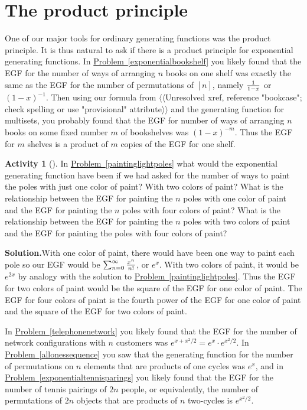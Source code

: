 \documentclass[10pt,]{book}
\theoremstyle{plain}
\theoremstyle{definition}
\newtheorem{activity}[project]{Activity}
\numberwithin{equation}{chapter}
\begin{document}
\section[{The product principle}]{The product principle}\label{section-9}
One of our major tools for ordinary generating functions was the product principle. It is thus natural to ask if there is a product principle for exponential generating functions. In \hyperref[exponentialbookshelf]{Problem~\ref{exponentialbookshelf}} you likely found that the EGF for the number of ways of arranging \(n\) books on one shelf was exactly the same as the EGF for the number of permutations of \([n]\), namely \(1\over 1-x\) or \((1-x)^{-1}\). Then using our formula from {$\langle\langle$Unresolved xref, reference "bookcase"; check spelling or use "provisional" attribute$\rangle\rangle$} and the generating function for multisets, you probably found that the EGF for number of ways of arranging \(n\) books on some fixed number \(m\) of bookshelves was \((1-x)^{-m}\). Thus the EGF for \(m\) shelves is a product of \(m\) copies of the EGF for one shelf.%
\begin{activity}[]\label{paintinglightpoles2}
In \hyperref[paintinglightpoles]{Problem~\ref{paintinglightpoles}} what would the exponential generating function have been if we had asked for the number of ways to paint the poles with just one color of paint? With two colors of paint? What is the relationship between the EGF for painting the \(n\) poles with one color of paint and the EGF for painting the \(n\) poles with four colors of paint? What is the relationship between the EGF for painting the \(n\) poles with two colors of paint and the EGF for painting the poles with four colors of paint?%
\par\medskip\noindent%
\textbf{Solution.}\quad With one color of paint, there would have been one way to paint each pole so our EGF would be \(\sum_{n=0}^\infty {x^n\over n!}\), or \(e^x\). With two colors of paint, it would be \(e^{2x}\) by analogy with the solution to \hyperref[paintinglightpoles]{Problem~\ref{paintinglightpoles}}. Thus the EGF for two colors of paint would be the square of the EGF for one color of paint. The EGF for four colors of paint is the fourth power of the EGF for one color of paint and the square of the EGF for two colors of paint.%
\end{activity}
In \hyperref[telephonenetwork]{Problem~\ref{telephonenetwork}} you likely found that the EGF for the number of network configurations with \(n\) customers was \(e^{x+x^2/2}= e^x \cdot
e^{x^2/2}\). In \hyperref[allonessequence]{Problem~\ref{allonessequence}} you saw that the generating function for the number of permutations on \(n\) elements that are products of one cycles was \(e^x\), and in \hyperref[exponentialtennisparings]{Problem~\ref{exponentialtennisparings}} you likely found that the EGF for the number of tennis pairings of \(2n\) people, or equivalently, the number of permutations of \(2n\) objects that are products of \(n\) two-cycles is \(e^{x^2/2}\).%
\end{document}
